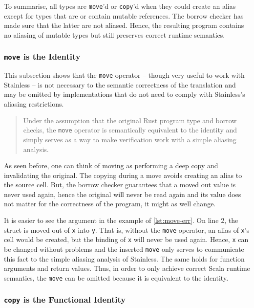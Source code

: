 To summarise, all types are \lstinline!move!'d or \lstinline!copy!'d when they
could create an alias except for types that are or contain mutable references.
The borrow checker has made sure that the latter are not aliased. Hence, the
resulting program contains no aliasing of mutable types but still preserves
correct runtime semantics.

\subsubsection{\texttt{move} is the Identity}

This subsection shows that the \lstinline!move! operator -- though very useful
to work with Stainless -- is not necessary to the semantic correctness of the
translation and may be omitted by implementations that do not need to comply
with Stainless's aliasing restrictions.

\begin{quote}
Under the assumption that the original Rust program type and borrow checks, the
\lstinline!move! operator is semantically equivalent to the identity and simply
serves as a way to make verification work with a simple aliasing analysis.
\end{quote}

As seen before, one can think of moving as performing a deep copy and
invalidating the original. The copying during a move avoids creating an alias to
the source cell. But, the borrow checker guarantees that a moved out value is
never used again, hence the original will never be read again and its value does
not matter for the correctness of the program, it might as well change.

It is easier to see the argument in the example of \autoref{lst:move-err}. On
line 2, the struct is moved out of \lstinline!x! into \lstinline!y!. That is,
without the \lstinline!move! operator, an alias of \lstinline!x!'s cell would be
created, but the binding of \lstinline!x! will never be used again. Hence,
\lstinline!x! can be changed without problems and the inserted \lstinline!move!
only serves to communicate this fact to the simple aliasing analysis of
Stainless. The same holds for function arguments and return values. Thus, in
order to only achieve correct Scala runtime semantics, the \lstinline!move! can
be omitted because it is equivalent to the identity.

\subsubsection{\texttt{copy} is the Functional Identity}

